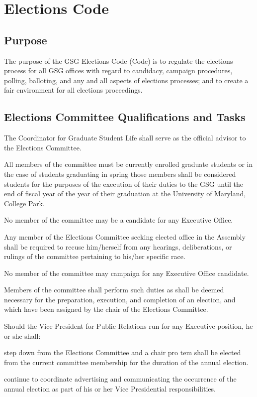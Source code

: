 \chapter{Elections Code}

\section{Purpose}

The purpose of the GSG Elections Code (Code) is to regulate the elections process for all GSG offices with regard to candidacy, campaign procedures, polling, balloting, and any and all aspects of elections processes; and to create a fair environment for all elections proceedings.

\section{Elections Committee Qualifications and Tasks}
\begin{bylaws-number}
  \item The Coordinator for Graduate Student Life shall serve as the official advisor to the Elections Committee.
  \begin{bylaws-number}
    \item All members of the committee must be currently enrolled graduate students or in the case of students graduating in spring those members shall be considered students for the purposes of the execution of their duties to the GSG until the end of fiscal year of the year of their graduation at the University of Maryland, College Park.
    \item No member of the committee may be a candidate for any Executive Office.
    \item Any member of the Elections Committee seeking elected office in the Assembly shall be required to recuse him/herself from any hearings, deliberations, or rulings of the committee pertaining to his/her specific race.
    \item No member of the committee may campaign for any Executive Office candidate.
    \item Members of the committee shall perform such duties as shall be deemed necessary for the preparation, execution, and completion of an election, and which have been assigned by the chair of the Elections Committee.
    \item Should the Vice President for Public Relations run for any Executive position, he or she shall:
    \begin{bylaws-number}
      \item step down from the Elections Committee and a chair pro tem shall be elected from the current committee membership for the duration of the annual election.
      \item continue to coordinate advertising and communicating the occurrence of the annual election as part of his or her Vice Presidential responsibilities.
    \end{bylaws-number}
  \end{bylaws-number}
\end{bylaws-number}

